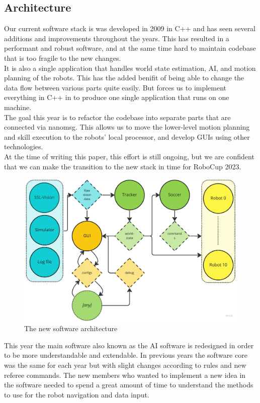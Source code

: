 \documentclass[runningheads]{llncs}
\begin{document}
\subsection{Architecture}
Our current software stack is was developed in 2009 in C++ and has seen several additions and improvements throughout the years. This has resulted in a performant and robust software, and at the same time hard to maintain codebase that is too fragile to the new changes.\\
\indent It is also a single application that handles world state estimation, AI, and motion planning of the robots. This has the added benifit of being able to change the data flow between various parts quite easily. But forces us to implement everything in C++ in to produce one single application that runs on one machine.\\
\indent The goal this year is to refactor the codebase into separate parts that are connected via nanomsg. This allows us to move the lower-level motion planning and skill execution to the robots' local processor, and develop GUIs using other technologies. \\
\indent At the time of writing this paper, this effort is still ongoing, but we are confident that we can make the transition to the new stack in time for RoboCup 2023.

\begin{figure}
	\centering
	\includegraphics[width=1.0\textwidth]{images/software-architecture.jpg}
	\caption{The new software architecture}
	\label{fig:software-architecture}
\end{figure}

This year the main software also known as the AI software is redesigned in order to be more understandable and extendable. In previous years the software core was the same for each year but with slight changes according to rules and new referee commands. The new members who wanted to implement a new idea in the software needed to spend a great amount of time to understand the methods to use for the robot navigation and data input.
\end{document}
